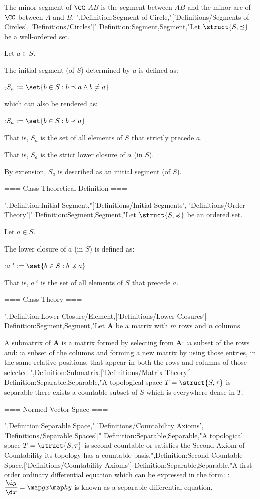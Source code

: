 The minor segment of $\CC$  $AB$ is the segment between $AB$ and the minor arc of $\CC$ between $A$ and $B$.
",Definition:Segment of Circle,"['Definitions/Segments of Circles', 'Definitions/Circles']"
Definition:Segment,Segment,"Let $\struct {S, \preceq}$ be a well-ordered set.

Let $a \in S$.


The initial segment (of $S$) determined by $a$ is defined as:

:$S_a := \set {b \in S: b \preceq a \land b \ne a}$

which can also be rendered as:

:$S_a := \set {b \in S: b \prec a}$


That is, $S_a$ is the set of all elements of $S$ that strictly precede $a$.

That is, $S_a$ is the strict lower closure of $a$ (in $S$).


By extension, $S_a$ is described as an initial segment (of $S$).


=== Class Theoretical Definition ===

",Definition:Initial Segment,"['Definitions/Initial Segments', 'Definitions/Order Theory']"
Definition:Segment,Segment,"Let $\struct {S, \preccurlyeq}$ be an ordered set.

Let $a \in S$.


The lower closure of $a$ (in $S$) is defined as:

:$a^\preccurlyeq := \set {b \in S: b \preccurlyeq a}$


That is, $a^\preccurlyeq$ is the set of all elements of $S$ that precede $a$.


=== Class Theory ===

",Definition:Lower Closure/Element,['Definitions/Lower Closures']
Definition:Segment,Segment,"Let $\mathbf A$ be a matrix with $m$ rows and $n$ columns.


A submatrix of $\mathbf A$ is a matrix formed by selecting from $\mathbf A$:
:a subset of the rows
and:
:a subset of the columns
and forming a new matrix by using those entries, in the same relative positions, that appear in both the rows and columns of those selected.",Definition:Submatrix,['Definitions/Matrix Theory']
Definition:Separable,Separable,"A topological space $T = \struct {S, \tau}$ is separable  there exists a countable subset of $S$ which is everywhere dense in $T$.


=== Normed Vector Space ===


",Definition:Separable Space,"['Definitions/Countability Axioms', 'Definitions/Separable Spaces']"
Definition:Separable,Separable,"A topological space $T = \struct {S, \tau}$ is second-countable or satisfies the Second Axiom of Countability  its topology has a countable basis.",Definition:Second-Countable Space,['Definitions/Countability Axioms']
Definition:Separable,Separable,"A first order ordinary differential equation which can be expressed in the form:
:$\dfrac {\d y} {\d x} = \map g x \map h y$
is known as a separable differential equation.


